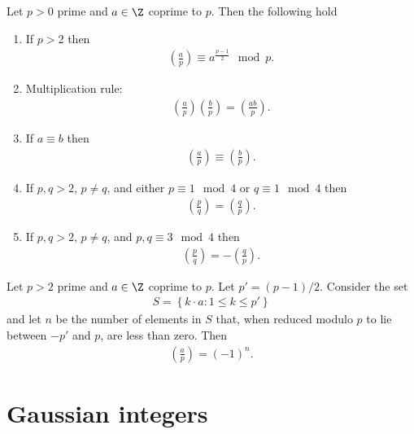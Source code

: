 \documentclass{article}
\begin{document}
\begin{theorem}[Lecture 11]
	Let $p>0$ prime and $a\in\Z$ coprime to $p$. Then the following hold
	\begin{enumerate}
		\item If $p>2$ then \begin{align*}
			      \left(\frac{a}{p}\right)\equiv a^{\frac{p-1}{2}} \mod p.
		      \end{align*}
		\item Multiplication rule: \begin{align*}
			      \left(\frac{a}{p}\right)\left(\frac{b}{p}\right)=\left(\frac{ab}{p}\right).
		      \end{align*}
		\item If $a\equiv b$ then \begin{align*}
			      \left(\frac{a}{p}\right)\equiv\left(\frac{b}{p}\right).
		      \end{align*}
		\item If $p,q>2$, $p\not=q$, and either $p\equiv 1\mod 4$ or $q\equiv 1\mod 4$ then \begin{align*}
			      \left(\frac{p}{q}\right)=\left(\frac{q}{p}\right).
		      \end{align*}
		\item If $p,q>2$, $p\not=q$, and $p,q\equiv 3\mod 4$ then \begin{align*}
			      \left(\frac{p}{q}\right)=-\left(\frac{q}{p}\right).
		      \end{align*}
	\end{enumerate}
\end{theorem}

\begin{lemma}[Gauss]
	Let $p>2$ prime and $a\in\Z$ coprime to $p$. Let $p'=(p-1)/2$. Consider the set
	\begin{align*}
		S=\left\lbrace k\cdot a : 1\leq k\leq p'\right\rbrace
	\end{align*}
	and let $n$ be the number of elements in $S$ that, when reduced modulo $p$ to lie between
	$-p'$ and $p$, are less than zero. Then
	\begin{align*}
		\left(\frac{a}{p}\right)=(-1)^n.
	\end{align*}
\end{lemma}

\section{Gaussian integers}
\end{document}
